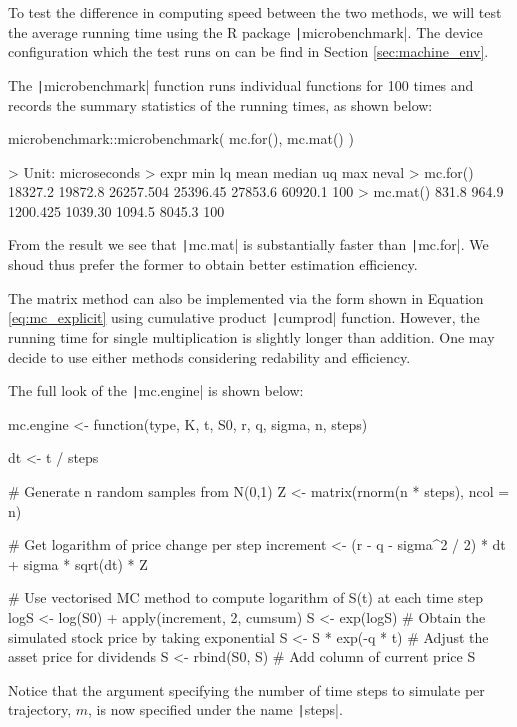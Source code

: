 To test the difference in computing speed between the two methods, we will test the average running time using the R package \texttt|microbenchmark|. The device configuration which the test runs on can be find in Section \ref{sec:machine_env}.

The \texttt|microbenchmark| function runs individual functions for 100 times and records the summary statistics of the running times, as shown below:

\begin{Rminted}
microbenchmark::microbenchmark(
    mc.for(),
    mc.mat()
)

>     Unit: microseconds
>     expr     min      lq      mean   median      uq     max neval
> mc.for() 18327.2 19872.8 26257.504 25396.45 27853.6 60920.1   100
> mc.mat()   831.8   964.9  1200.425  1039.30  1094.5  8045.3   100
\end{Rminted}

From the result we see that \texttt|mc.mat| is substantially faster than \texttt|mc.for|. We shoud thus prefer the former to obtain better estimation efficiency.

The matrix method can also be implemented via the form shown in Equation \ref{eq:mc_explicit} using cumulative product \texttt|cumprod| function. However, the running time for single multiplication is slightly longer than addition. One may decide to use either methods considering redability and efficiency.

The full look of the \texttt|mc.engine| is shown below:

\begin{Rminted}
mc.engine <- function(type, K, t, S0, r, q, sigma, n, steps) {

    dt <- t / steps

    # Generate n random samples from N(0,1)
    Z <- matrix(rnorm(n * steps), ncol = n)

    # Get logarithm of price change per step
    increment <- (r - q - sigma^2 / 2) * dt + sigma * sqrt(dt) * Z

    # Use vectorised MC method to compute logarithm of S(t) at each time step
    logS <- log(S0) + apply(increment, 2, cumsum)
    S <- exp(logS) # Obtain the simulated stock price by taking exponential
    S <- S * exp(-q * t) # Adjust the asset price for dividends
    S <- rbind(S0, S) # Add column of current price
    S
}
\end{Rminted}

Notice that the argument specifying the number of time steps to simulate per trajectory, $m$, is now specified under the name \texttt|steps|.

